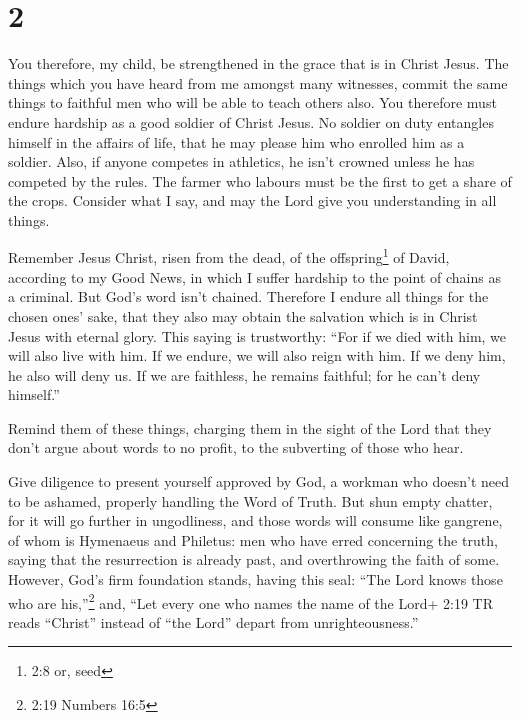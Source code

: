\hypertarget{section-1}{%
\section{2}\label{section-1}}

 You therefore, my child, be strengthened in the grace that
is in Christ Jesus.  The things which you have heard from me
amongst many witnesses, commit the same things to faithful men who will
be able to teach others also.  You therefore must endure
hardship as a good soldier of Christ Jesus.  No soldier on
duty entangles himself in the affairs of life, that he may please him
who enrolled him as a soldier.  Also, if anyone competes in
athletics, he isn't crowned unless he has competed by the rules.
 The farmer who labours must be the first to get a share of
the crops.  Consider what I say, and may the Lord give you
understanding in all things.

 Remember Jesus Christ, risen from the dead, of the
offspring\footnote{2:8 or, seed} of David, according to my Good News,
 in which I suffer hardship to the point of chains as a
criminal. But God's word isn't chained.  Therefore I endure
all things for the chosen ones' sake, that they also may obtain the
salvation which is in Christ Jesus with eternal glory. 
This saying is trustworthy: ``For if we died with him, we will also live
with him.  If we endure, we will also reign with him. If we
deny him, he also will deny us.  If we are faithless, he
remains faithful; for he can't deny himself.''

 Remind them of these things, charging them in the sight of
the Lord that they don't argue about words to no profit, to the
subverting of those who hear.

 Give diligence to present yourself approved by God, a
workman who doesn't need to be ashamed, properly handling the Word of
Truth.  But shun empty chatter, for it will go further in
ungodliness,  and those words will consume like gangrene,
of whom is Hymenaeus and Philetus:  men who have erred
concerning the truth, saying that the resurrection is already past, and
overthrowing the faith of some.  However, God's firm
foundation stands, having this seal: ``The Lord knows those who are
his,''\footnote{2:19 Numbers 16:5} and, ``Let every one who names the
name of the Lord+ 2:19 TR reads ``Christ'' instead of ``the Lord''
depart from unrighteousness.''


